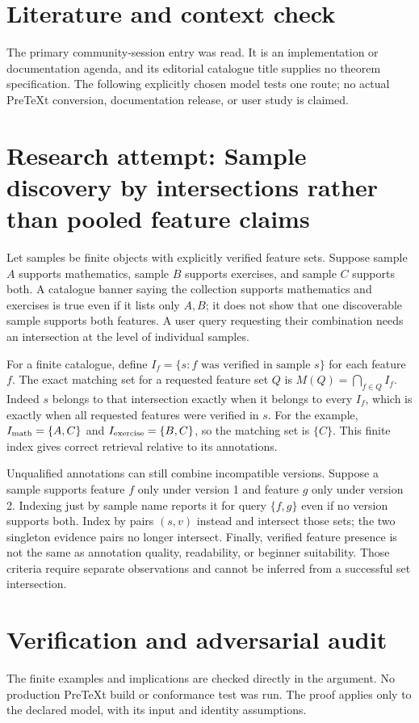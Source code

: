 \documentclass[11pt]{article}
\begin{document}
\section{Literature and context check}
The primary community-session entry was read. It is an implementation or documentation agenda, and its editorial catalogue title supplies no theorem specification. The following explicitly chosen model tests one route; no actual PreTeXt conversion, documentation release, or user study is claimed.
\section{Research attempt: Sample discovery by intersections rather than pooled feature claims}
Let samples be finite objects with explicitly verified feature sets. Suppose sample $A$ supports mathematics, sample $B$ supports exercises, and sample $C$ supports both. A catalogue banner saying the collection supports mathematics and exercises is true even if it lists only $A,B$; it does not show that one discoverable sample supports both features. A user query requesting their combination needs an intersection at the level of individual samples.

For a finite catalogue, define $I_f=\{s:f\text{ was verified in sample }s\}$ for each feature $f$. The exact matching set for a requested feature set $Q$ is $M(Q)=\bigcap_{f\in Q}I_f$. Indeed $s$ belongs to that intersection exactly when it belongs to every $I_f$, which is exactly when all requested features were verified in $s$. For the example, $I_{\rm math}=\{A,C\}$ and $I_{\rm exercise}=\{B,C\}$, so the matching set is $\{C\}$. This finite index gives correct retrieval relative to its annotations.

Unqualified annotations can still combine incompatible versions. Suppose a sample supports feature $f$ only under version 1 and feature $g$ only under version 2. Indexing just by sample name reports it for query $\{f,g\}$ even if no version supports both. Index by pairs $(s,v)$ instead and intersect those sets; the two singleton evidence pairs no longer intersect. Finally, verified feature presence is not the same as annotation quality, readability, or beginner suitability. Those criteria require separate observations and cannot be inferred from a successful set intersection.
\section{Verification and adversarial audit}
The finite examples and implications are checked directly in the argument. No production PreTeXt build or conformance test was run. The proof applies only to the declared model, with its input and identity assumptions.
\end{document}
